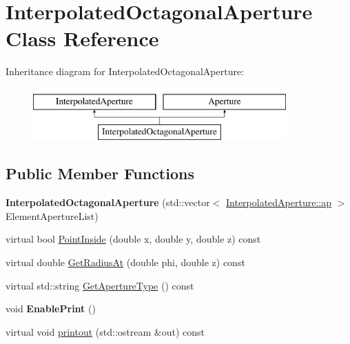 \hypertarget{classInterpolatedOctagonalAperture}{}\section{Interpolated\+Octagonal\+Aperture Class Reference}
\label{classInterpolatedOctagonalAperture}
Inheritance diagram for Interpolated\+Octagonal\+Aperture\+:\begin{figure}[H]
\begin{center}
\leavevmode
\includegraphics[height=2.000000cm]{classInterpolatedOctagonalAperture}
\end{center}
\end{figure}
\subsection*{Public Member Functions}
\begin{DoxyCompactItemize}
\item 
\mbox{\label{classInterpolatedOctagonalAperture_af4358601b30f900de27456482339415e}} 
{\bfseries Interpolated\+Octagonal\+Aperture} (std\+::vector$<$ \hyperlink{structInterpolatedAperture_1_1ap}{Interpolated\+Aperture\+::ap} $>$ Element\+Aperture\+List)
\item 
virtual bool \hyperlink{classInterpolatedOctagonalAperture_a7d2e6993a0d679e23038ca88245db59b}{Point\+Inside} (double x, double y, double z) const
\item 
virtual double \hyperlink{classInterpolatedOctagonalAperture_a92937e111009433a274722eb316270e1}{Get\+Radius\+At} (double phi, double z) const
\item 
virtual std\+::string \hyperlink{classInterpolatedOctagonalAperture_a9e16536001e2732bcaf15d55134e05bf}{Get\+Aperture\+Type} () const
\item 
\mbox{\label{classInterpolatedOctagonalAperture_a451b6969d069c3de4f07510051792335}} 
void {\bfseries Enable\+Print} ()
\item 
virtual void \hyperlink{classInterpolatedOctagonalAperture_ad1e9dcb72289db534c78e297fa4c8197}{printout} (std\+::ostream \&out) const
\end{DoxyCompactItemize}
